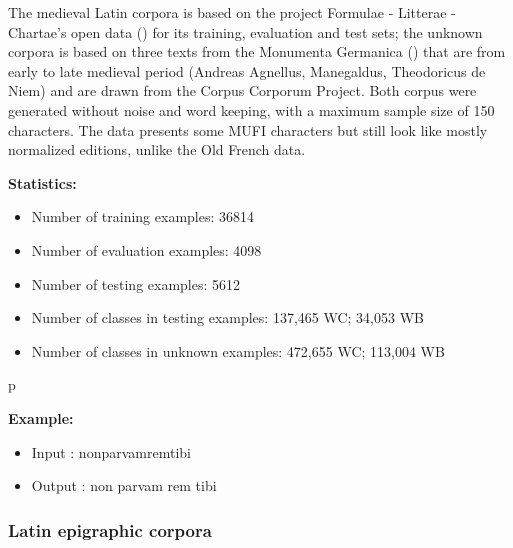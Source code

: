 \documentclass{jdmdh}
\begin{document}

The medieval Latin corpora is based on the project Formulae - Litterae - Chartae's open data (\citet{formulae}) for its training, evaluation and test sets; the unknown corpora is based on three texts from the Monumenta Germanica (\citet{germanica}) that are from early to late medieval period (Andreas Agnellus, Manegaldus, Theodoricus de Niem) and are drawn from the Corpus Corporum Project. Both corpus were generated without noise and word keeping, with a maximum sample size of 150 characters. The data presents some MUFI characters but still look like mostly normalized editions, unlike the Old French data.

\textbf{Statistics:}

\begin{itemize}
\item Number of training examples: 36814
\item Number of evaluation examples: 4098
\item Number of testing examples: 5612
\item Number of classes in testing examples: 137,465 WC; 34,053 WB
\item Number of classes in unknown examples: 472,655 WC; 113,004 WB
\end{itemize}p

\textbf{Example:}

\begin{itemize}
    \item Input : nonparvamremtibi  
    \item Output : non parvam rem tibi

\end{itemize}

\subsubsection{Latin epigraphic corpora}
\end{document}
